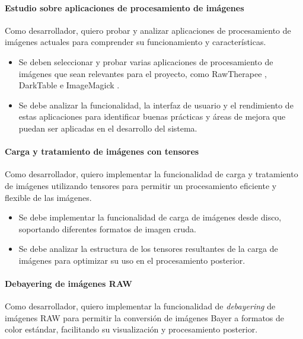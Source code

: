 \paragraph{Estudio sobre aplicaciones de procesamiento de imágenes} \label{hist:estudio_aplicaciones_procesamiento_imagenes}
Como desarrollador, quiero probar y analizar aplicaciones de procesamiento de imágenes actuales para comprender su funcionamiento y características.

\begin{itemize}[noitemsep]
	\item Se deben seleccionar y probar varias aplicaciones de procesamiento de imágenes que sean relevantes para el proyecto, 
	como RawTherapee \cite{raw_therapee}, DarkTable \cite{darktable} e ImageMagick \cite{image_magick}.
	\item Se debe analizar la funcionalidad, la interfaz de usuario y el rendimiento de estas aplicaciones para identificar buenas 
	prácticas y áreas de mejora que puedan ser aplicadas en el desarrollo del sistema.
\end{itemize}
\newpage

\newpage

\paragraph{Carga y tratamiento de imágenes con tensores} \label{hist:carga_tratamiento_imagenes_tensores}
Como desarrollador, quiero implementar la funcionalidad de carga y tratamiento de imágenes utilizando tensores para
permitir un procesamiento eficiente y flexible de las imágenes.

\begin{itemize}[noitemsep]
	\item Se debe implementar la funcionalidad de carga de imágenes desde disco, soportando diferentes
	formatos de imagen cruda.
	\item Se debe analizar la estructura de los tensores resultantes de la carga de imágenes para 
	optimizar su uso en el procesamiento posterior.
\end{itemize}

\paragraph{Debayering de imágenes RAW} \label{hist:debayering_imagenes_raw}
Como desarrollador, quiero implementar la funcionalidad de \textit{debayering} de imágenes RAW para permitir la 
conversión de imágenes Bayer a formatos de color estándar, facilitando su visualización y procesamiento posterior.

